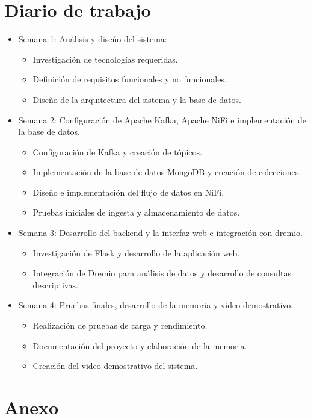 \documentclass{../../../miPlantilla}
\begin{document}
\section{Diario de trabajo}
\begin{itemize}
  \item Semana 1: Análisis y diseño del sistema:
  \begin{itemize}
    \item Investigación de tecnologías requeridas.
    \item Definición de requisitos funcionales y no funcionales.
    \item Diseño de la arquitectura del sistema y la base de datos.
  \end{itemize}
  \item Semana 2: Configuración de Apache Kafka, Apache NiFi e implementación de la base de datos.
  \begin{itemize}
    \item Configuración de Kafka y creación de tópicos.
    \item Implementación de la base de datos MongoDB y creación de colecciones.
    \item Diseño e implementación del flujo de datos en NiFi.
    \item Pruebas iniciales de ingesta y almacenamiento de datos.
  \end{itemize}
  \item Semana 3: Desarrollo del backend y la interfaz web e integración con dremio.
  \begin{itemize}
    \item Investigación de Flask y desarrollo de la aplicación web.
    \item Integración de Dremio para análisis de datos y desarrollo de consultas descriptivas.
  \end{itemize}
  \newpage
  \item Semana 4: Pruebas finales, desarrollo de la memoria y video demostrativo.
  \begin{itemize}
    \item Realización de pruebas de carga y rendimiento.
    \item Documentación del proyecto y elaboración de la memoria.
    \item Creación del video demostrativo del sistema.
  \end{itemize}
\end{itemize}

\section{Anexo}
\end{document}
